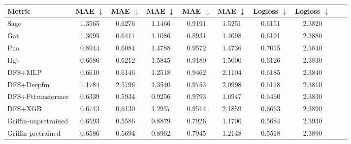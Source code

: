 \documentclass{article}
\theoremstyle{plain}
\theoremstyle{definition}
\theoremstyle{remark}
\begin{document}
\begin{table}[h]
{\begin{tabular}{lccccccccc}
        \textbf{Metric} & \textbf{MAE $\downarrow$} & \textbf{MAE $\downarrow$} & \textbf{MAE $\downarrow$} & \textbf{MAE $\downarrow$} & \textbf{MAE $\downarrow$} & \textbf{Logloss $\downarrow$} & \textbf{Logloss $\downarrow$} \\
        \midrule
        Sage & 1.3565 & 0.6276 & 1.1466 & 0.9191 & 1.5251 & 0.6151 & 2.3820 \\
        Gat & 1.3695 & 0.6417 & 1.1086 & 0.8931 & 1.4098 & 0.6191 & 2.3880 \\
        Pna & 0.8944 & 0.6084 & 1.4788 & 0.9572 & 1.4736 & 0.7015 & 2.3840 \\
        Hgt & 0.6686 & 0.6212 & 1.5845 & 0.9180 & 1.5000 & 0.6126 & 2.3830 \\
        DFS+MLP & 0.6610 & 0.6146 & 1.2518 & 0.9462 & 2.1104 & 0.6185 & 2.3840 \\
        DFS+Deepfm & 1.1784 & 2.5796 & 1.3540 & 0.9753 & 2.0998 & 0.6118 & 2.3810 \\
        DFS+Fttransformer & 0.6339 & 0.5934 & 0.9256 & 0.9793 & 1.6947 & 0.6460 & 2.3830 \\
        DFS+XGB & 0.6743 & 0.6130 & 1.2957 & 0.9514 & 2.1859 & 0.6663 & 2.3890 \\
        Griffin-unpretrained & 0.6593 & 0.5586 & 0.8879 & 0.7926 & 1.1700 & 0.5684 & 2.3930 \\
        Griffin-pretrained & 0.6586 & 0.5694 & 0.8962 & 0.7945 & 1.2148 & 0.5518 & 2.3890 \\
        \bottomrule
    \end{tabular}
    }
        \label{tab:figure-2}
\end{table}
\end{document}
